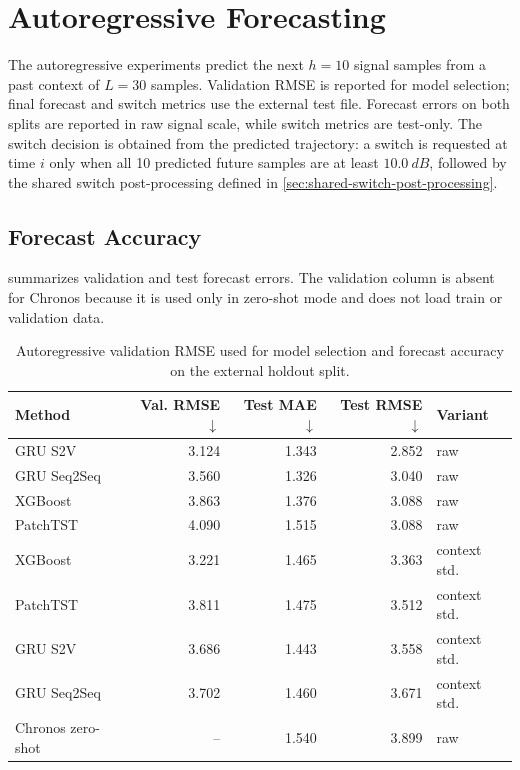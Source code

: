 \section{Autoregressive Forecasting}
\label{sec:results-autoregressive}

The autoregressive experiments predict the next \(h=10\) signal samples from a
past context of \(L=30\) samples. Validation RMSE is reported for model
selection; final forecast and switch metrics use the external test file.
Forecast errors on both splits are reported in raw signal scale, while switch
metrics are test-only.
The switch decision is obtained from the predicted trajectory: a switch is
requested at time \(i\) only when all 10 predicted future samples are at least
\(\SI{10.0}{dB}\), followed by the shared switch post-processing defined in
\cref{sec:shared-switch-post-processing}.

\subsection{Forecast Accuracy}
\label{sec:results-autoregressive-forecast-accuracy}

 summarizes validation and test
forecast errors. The validation column is absent for Chronos because it is used
only in zero-shot mode and does not load train or validation data.

\begin{table}[htbp]
  \centering
  \caption{Autoregressive validation RMSE used for model selection and forecast
  accuracy on the external holdout split.}
  \label{tab:autoregressive-forecast-results}
  \footnotesize
  \setlength{\tabcolsep}{3pt}
  \renewcommand{\arraystretch}{1.15}
  \begin{tabular}{
    @{}
    >{\raggedright\arraybackslash}p{}
    rrr
    >{\raggedright\arraybackslash}p{}
    @{}
  }
    \toprule
    Method & Val. RMSE \(\downarrow\) & Test MAE \(\downarrow\) & Test RMSE \(\downarrow\) & Variant \\
    \midrule
    GRU S2V & 3.124 & 1.343 & 2.852 & raw \\
    GRU Seq2Seq & 3.560 & 1.326 & 3.040 & raw \\
    XGBoost & 3.863 & 1.376 & 3.088 & raw \\
    PatchTST & 4.090 & 1.515 & 3.088 & raw \\
    XGBoost & 3.221 & 1.465 & 3.363 & context std. \\
    PatchTST & 3.811 & 1.475 & 3.512 & context std. \\
    GRU S2V & 3.686 & 1.443 & 3.558 & context std. \\
    GRU Seq2Seq & 3.702 & 1.460 & 3.671 & context std. \\
    Chronos zero-shot & -- & 1.540 & 3.899 & raw \\
    \bottomrule
  \end{tabular}
\end{table}

